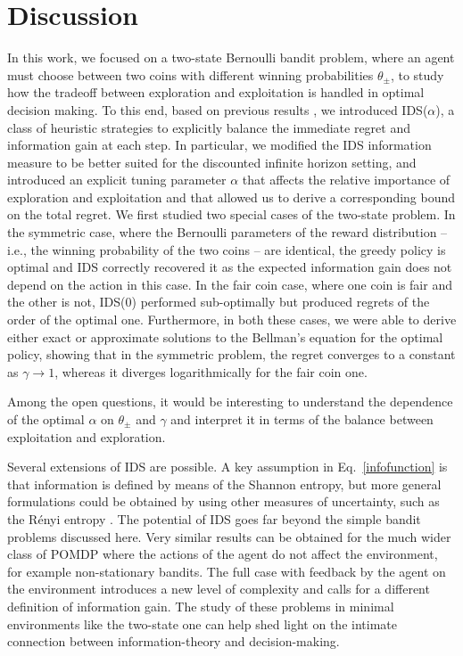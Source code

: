 \documentclass[aps,nofootinbib,groupaddress,superscriptaddress,reprint,amsmath,amssymb,graphicx,onecolumn,prx]{revtex4-2}
\begin{document}
\section{Discussion}
\noindent In this work, we focused on a two-state Bernoulli bandit problem, where an agent must choose between two coins with different winning probabilities $\theta_\pm$, to study how the tradeoff between exploration and exploitation is handled in optimal decision making. To this end, based on previous results \cite{russo2014learning}, we introduced IDS($\alpha$), a class of heuristic strategies to explicitly balance the immediate regret and information gain at each step. In particular, we modified the IDS information measure to be better suited for the discounted infinite horizon setting, and introduced an explicit tuning parameter $\alpha$ that affects the relative importance of exploration and exploitation and that allowed us to derive a corresponding bound on the total regret. We first studied two special cases of the two-state problem. In the symmetric case, where the Bernoulli parameters of the reward distribution -- i.e., the winning probability of the two coins -- are identical, the greedy policy is optimal and IDS correctly recovered it as the expected information gain does not depend on the action in this case. In the fair coin case, where one coin is fair and the other is not, IDS($0$) performed sub-optimally but produced regrets of the order of the optimal one. Furthermore, in both these cases, we were able to derive either exact or approximate solutions to the Bellman's equation for the optimal policy, showing that in the symmetric problem, the regret converges to a constant as $\gamma \to 1$, whereas it diverges logarithmically for the fair coin one. 

Among the open questions, it would be interesting to understand the dependence of the optimal
$\alpha$  on $\theta_{\pm}$ and $\gamma$ and interpret it in terms of the balance between exploitation and exploration.

Several extensions of IDS are possible. A key assumption in Eq.~\eqref{infofunction} is that information is defined by means of the Shannon entropy, but more general formulations could be obtained by using other measures of uncertainty, such as the Rényi entropy \cite{renyi1961measures,zimmert2021tsallis}. 
The potential of IDS goes far beyond the simple bandit problems discussed here. Very similar results can be obtained for the much wider class of POMDP where the actions of the agent do not affect the environment, for example non-stationary bandits. The full case with feedback by the agent on the environment introduces a new level of complexity and calls for a different definition of information gain. The study of these problems in minimal environments like the two-state one can help shed light on the intimate connection between information-theory and decision-making.
\end{document}
